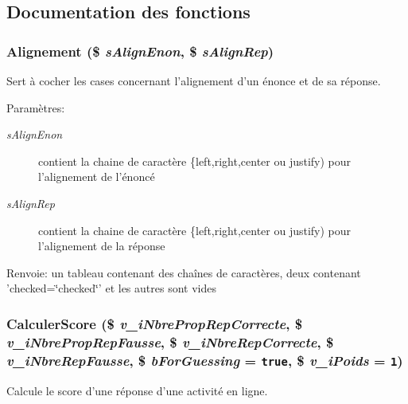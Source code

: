 \subsection{Documentation des fonctions}
\subsubsection{\setlength{\rightskip}{0pt plus 5cm}Alignement (\$ {\em sAlignEnon}, \/  \$ {\em sAlignRep})}\label{fonctions__form_8inc_8php_ed82bcba8c9e3b5afe8832c29121af9e}


Sert à cocher les cases concernant l'alignement d'un énonce et de sa réponse. 

\begin{Desc}
\item[Paramètres:]
\begin{description}
\item[{\em sAlignEnon}]contient la chaine de caractère \{left,right,center ou justify) pour l'alignement de l'énoncé \item[{\em sAlignRep}]contient la chaine de caractère \{left,right,center ou justify) pour l'alignement de la réponse\end{description}
\end{Desc}
\begin{Desc}
\item[Renvoie:]un tableau contenant des chaînes de caractères, deux contenant 'checked=\char`\"{}checked\char`\"{}' et les autres sont vides \end{Desc}
\subsubsection{\setlength{\rightskip}{0pt plus 5cm}CalculerScore (\$ {\em v\_\-iNbrePropRepCorrecte}, \/  \$ {\em v\_\-iNbrePropRepFausse}, \/  \$ {\em v\_\-iNbreRepCorrecte}, \/  \$ {\em v\_\-iNbreRepFausse}, \/  \$ {\em bForGuessing} = {\tt true}, \/  \$ {\em v\_\-iPoids} = {\tt 1})}\label{fonctions__form_8inc_8php_8e427f12344f6543e309cf8f4844f8ec}


Calcule le score d'une réponse d'une activité en ligne. 

